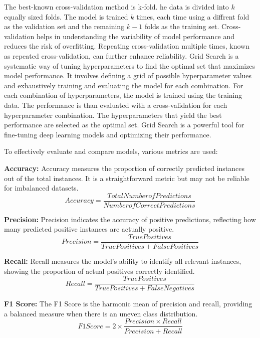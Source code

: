 The best-known cross-validation method is k-fold. he data is divided into $k$ equally sized folds. The model is trained $k$ times, each time using a diffrent fold as the validation set and the remaining $k-1$ folds as the training set. Cross-validation helps in understanding the variability of model performance and reduces the risk of overfitting. Repeating cross-validation multiple times, known as repeated cross-validation, can further enhance reliability. \autocite{krstajicCrossvalidationPitfallsWhen2014}
Grid Search is a systematic way of tuning hyperparameters to find the optimal set that maximizes model performance. It involves defining a grid of possible hyperparameter values and exhaustively training and evaluating the model for each combination. For each combination of hyperparameters, the model is trained using the training data. The performance is than evaluated with a cross-validation for each hyperparameter combination. The hyperparameters that yield the best performance are selected as the optimal set. Grid Search is a powerful tool for fine-tuning deep learning models and optimizing their performance. \autocite{bergstraRandomSearchHyperParameter}

To effectively evaluate and compare models, various metrics are used: \autocite{PrecisionRecall2024} \autocite{Fscore2024} \autocite{AccuracyPrecision2024} 

\textbf{Accuracy:} Accuracy measures the proportion of correctly predicted instances out of the total instances. It is a straightforward metric but may not be reliable for imbalanced datasets.
\begin{equation}
    Accuracy = \frac{Total Number of Predictions}{Number of Correct Predictions}
\end{equation}

\textbf{Precision:} Precision indicates the accuracy of positive predictions, reflecting how many predicted positive instances are actually positive.
\begin{equation}
    Precision = \frac{True Positives}{True Positives + False Positives}
\end{equation}

\textbf{Recall:} Recall measures the model’s ability to identify all relevant instances, showing the proportion of actual positives correctly identified.
\begin{equation}
    Recall = \frac{True Positives}{True Positives + False Negatives}
\end{equation}

\textbf{F1 Score:} The F1 Score is the harmonic mean of precision and recall, providing a balanced measure when there is an uneven class distribution.
\begin{equation}
    F1 Score = 2 \times \frac{Precision \times Recall}{Precision + Recall}
\end{equation}